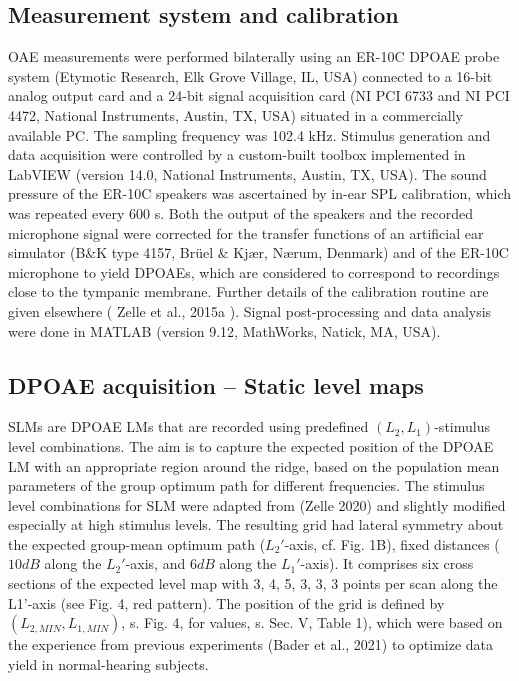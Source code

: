 \documentclass[journal,twoside,web]{ieeecolor2}
\begin{document}
\subsection{Measurement system and calibration}
OAE measurements were performed bilaterally using an ER-10C DPOAE probe system (Etymotic Research, Elk Grove Village, IL, USA) connected to a 16-bit analog output card and a 24-bit signal acquisition card (NI PCI 6733 and NI PCI 4472, National Instruments, Austin, TX, USA) situated in a commercially available PC. The sampling frequency was 102.4 kHz. Stimulus generation and data acquisition were controlled by a custom-built toolbox implemented in LabVIEW (version 14.0, National Instruments, Austin, TX, USA). The sound pressure of the ER-10C speakers was ascertained by in-ear SPL calibration, which was repeated every 600 s. Both the output of the speakers and the recorded microphone signal were corrected for the transfer functions of an artificial ear simulator (B\&K type 4157, Brüel \& Kjær, Nærum, Denmark) and of the ER-10C microphone to yield DPOAEs, which are considered to correspond to recordings close to the tympanic membrane. Further details of the calibration routine are given elsewhere ( Zelle et al., 2015a ). Signal post-processing and data analysis were done in MATLAB (version 9.12, MathWorks, Natick, MA, USA).

\subsection{DPOAE acquisition – Static level maps}
SLMs are DPOAE LMs that are recorded using predefined $(L_2, L_1)$-stimulus level combinations. The aim is to capture the expected position of the DPOAE LM with an appropriate region around the ridge, based on the population mean parameters of the group optimum path for different frequencies. The stimulus level combinations for SLM were adapted from (Zelle 2020) and slightly modified especially at high stimulus levels. The resulting grid had lateral symmetry about the expected group-mean optimum path ($L_2'$-axis, cf. Fig. 1B), fixed distances ($10 dB$ along the $L_2'$-axis, and $6 dB$ along the $L_1'$-axis). It comprises six cross sections of the expected level map with 3, 4, 5, 3, 3, 3 points per scan along the L1'-axis (see Fig. 4, red pattern). The position of the grid is defined by $(L_{2,MIN} , L_{1,MIN})$, s. Fig. 4, for values,  s. Sec. V, Table 1), which were based on the experience from previous experiments (Bader et al., 2021) to optimize data yield in normal-hearing subjects.
\end{document}
